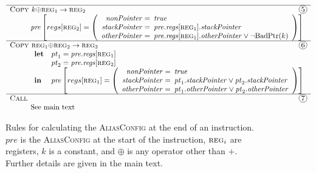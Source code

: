 \begin{figure}
\begin{displaymath}
\begin{array}{l}
    \hline
    \textsc{Copy } k {\oplus} \textsc{reg}_1 \rightarrow \textsc{reg}_2 \hfill \circled{5}\\
    \hspace{10mm}\mathit{pre}\left[regs[\textsc{reg}_2] = \left(\begin{array}{rl}
        \mathit{nonPointer} = & \!\!\!\true\\
        \mathit{stackPointer} = & \!\!\!\mathit{pre}.\mathit{regs}[\textsc{reg}_1].\mathit{stackPointer}\\
        \mathit{otherPointer} = & \!\!\!\mathit{pre}.\mathit{regs}[\textsc{reg}_1].\mathit{otherPointer} \vee {\neg}\smBadPtr{k}\\
      \end{array}\right)\right]\\
    \hline
    \textsc{Copy } \textsc{reg}_1 {\oplus} \textsc{reg}_2 \rightarrow \textsc{reg}_3 \hfill \circled{6}\\
    \hspace{10mm}\begin{array}{ll}
      \mathbf{let} & \mathit{pt}_1 = \mathit{pre}.\mathit{regs}[\textsc{reg}_1]\\
                   & \mathit{pt}_2 = \mathit{pre}.\mathit{regs}[\textsc{reg}_2]\\
      \mathbf{in}  & \mathit{pre}\left[regs[\textsc{reg}_1] = \left(\begin{array}{rl}
          \mathit{nonPointer} = & \!\!\!\mathit{true}\\
          \mathit{stackPointer} = & \!\!\!\mathit{pt}_1.\mathit{stackPointer} \vee \mathit{pt}_2.\mathit{stackPointer}\\
          \mathit{otherPointer} = & \!\!\!\mathit{pt}_1.\mathit{otherPointer} \vee \mathit{pt}_2.\mathit{otherPointer}\\
        \end{array}\right)\right]
    \end{array}\\
    \hline
    \textsc{Call} \hfill \circled{7}\\
    \hspace{10mm}\textrm{See main text}
  \end{array}
  \end{displaymath}
  \caption{Rules for calculating the \textsc{AliasConfig} at the end
    of an instruction.  $\mathit{pre}$ is the \textsc{AliasConfig}
    at the start of the instruction, $\textsc{reg}_i$ are registers,
    $k$ is a constant, and $\oplus$ is any operator other than $+$.
    Further details are given in the main text.}
  \label{fig:static_alias:update_rules}
\end{figure}

